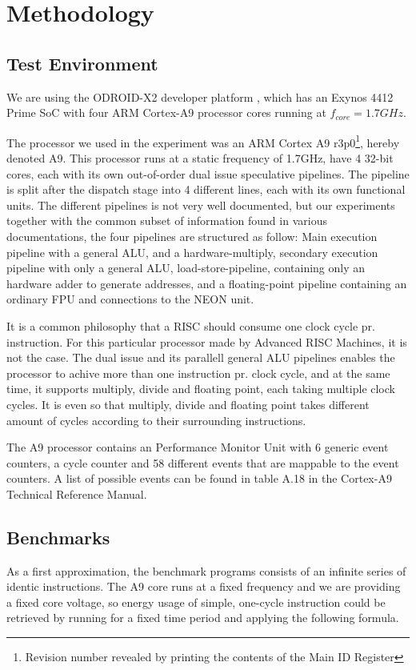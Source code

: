 \section{Methodology}


\subsection{Test Environment}
We are using the ODROID-X2 developer platform \cite{odroid-x2}, which has an
Exynos 4412 Prime SoC with four ARM Cortex-A9 processor cores running at
$f_{core} = 1.7 GHz$.

The processor we used in the experiment was an ARM Cortex A9
r3p0\footnote{Revision number revealed by printing the contents of the Main ID
Register}, hereby denoted A9. This processor runs at a static frequency of
1.7GHz, have 4 32-bit cores, each with its own out-of-order dual issue
speculative pipelines\cite{armtech}. The pipeline is split after the dispatch
stage into 4 different lines, each with its own functional units. The different
pipelines is not very well documented, but our experiments together with the
common subset of information found in various
documentations\cite{armtech}\cite{7cpu}\cite{lotofdocs}, the four pipelines are
structured as follow: Main execution pipeline with a  general ALU, and a
hardware-multiply, secondary execution pipeline with only a general ALU,
load-store-pipeline, containing only an hardware adder to generate addresses,
and a floating-point pipeline containing an ordinary FPU and connections to the
NEON unit.

It is a common philosophy that a RISC should consume one clock cycle pr.
instruction\cite{unknown}.  For this particular processor made by Advanced RISC
Machines, it is not the case. The dual issue and its parallell general ALU
pipelines enables the processor to achive more than one instruction pr. clock
cycle, and at the same time, it supports multiply, divide and floating point,
each taking multiple clock cycles. It is even so that multiply, divide and
floating point takes different amount of cycles according to their surrounding
instructions.

The A9 processor contains an Performance Monitor Unit with 6 generic event
counters, a cycle counter and 58 different events that are mappable to the event
counters\cite{armtech}. A list of possible events can be found in table A.18 in
the Cortex-A9 Technical Reference Manual\cite{armtech}.


\subsection{Benchmarks}
As a first approximation, the benchmark programs consists of an infinite series
of identic instructions. The A9 core runs at a fixed frequency and we are
providing a fixed core voltage, so energy usage of simple, one-cycle instruction
could be retrieved by running for a fixed time period and applying the following
formula.

